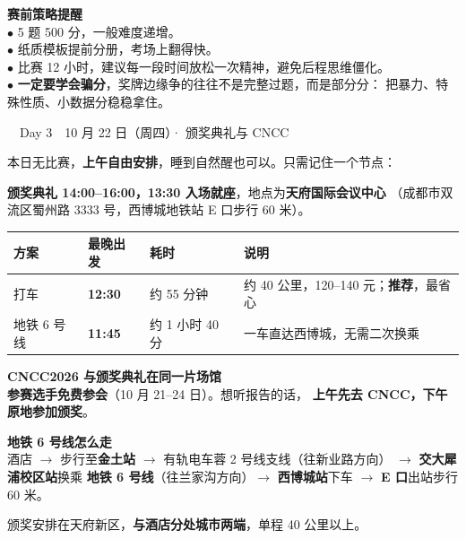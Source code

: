 \documentclass[11pt,a4paper,fontset=windows]{ctexart}
\newcommand{\thd}[1]{\textbf{\color{main}#1}}   %
\newcommand{\daytitle}[2]{%
  \vspace{0.7em}
  {\large\bfseries\color{white}\colorbox{main}{\strut\ \ #1\ \ \normalsize #2\ \ }}%
  \vspace{0.35em}\par}
\begin{document}
\begin{okbox}
\textbf{赛前策略提醒}\\
$\bullet$ 5 题 500 分，一般难度递增。\\
$\bullet$ 纸质模板提前分册，考场上翻得快。\\
$\bullet$ 比赛 12 小时，建议每一段时间放松一次精神，避免后程思维僵化。\\
$\bullet$ \textbf{一定要学会骗分}，奖牌边缘争的往往不是完整过题，而是部分分：
把暴力、特殊性质、小数据分稳稳拿住。
\end{okbox}

\newpage
\daytitle{Day 3}{10 月 22 日（周四）· 颁奖典礼与 CNCC}

本日无比赛，\textbf{上午自由安排}，睡到自然醒也可以。只需记住一个节点：

\textbf{颁奖典礼 14:00--16:00，13:30 入场就座}，地点为\textbf{天府国际会议中心}
（成都市双流区蜀州路 3333 号，西博城地铁站 E 口步行 60 米）。

\begin{center}
\begin{tabularx}{\textwidth}{@{}L{2.3cm}L{1.9cm}L{2.8cm}X@{}}
\toprule
\thd{方案} & \thd{最晚出发} & \thd{耗时} & \thd{说明}\\
\midrule
打车 & \textbf{12:30} & 约 55 分钟 & 约 40 公里，120--140 元；\textbf{推荐}，最省心\\
地铁 6 号线 & \textbf{11:45} & 约 1 小时 40 分 & 一车直达西博城，无需二次换乘\\
\bottomrule
\end{tabularx}
\end{center}

\begin{okbox}
\textbf{CNCC2026 与颁奖典礼在同一片场馆}\\
\textbf{参赛选手免费参会}（10 月 21--24 日）。想听报告的话，
\textbf{上午先去 CNCC，下午原地参加颁奖}。
\end{okbox}

\begin{keybox}
\textbf{地铁 6 号线怎么走}\\
酒店 $\rightarrow$ 步行至\textbf{金土站} $\rightarrow$ 有轨电车蓉 2 号线支线（往新业路方向）
$\rightarrow$ \textbf{交大犀浦校区站}换乘 \textbf{地铁 6 号线}（往兰家沟方向）$\rightarrow$
\textbf{西博城站}下车 $\rightarrow$ \textbf{E 口}出站步行 60 米。
\end{keybox}

\begin{warnbox}
颁奖安排在天府新区，\textbf{与酒店分处城市两端}，单程 40 公里以上。
\end{warnbox}
\end{document}
